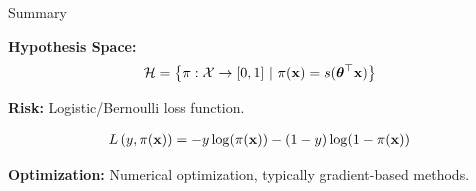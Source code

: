 \documentclass[11pt,compress,t,notes=noshow, xcolor=table]{beamer}
\begin{document}




 





\begin{frame}{Summary}

\textbf{Hypothesis Space:} 
\begin{eqnarray*}
  \mathcal{H} = \left\{\pi: \mathcal{X} \to [0,1] ~|~\pi(\mathbf{x}) = s(\bm{\theta}^\top \mathbf{x}) \right\}
\end{eqnarray*}

\lz

\textbf{Risk:} Logistic/Bernoulli loss function.

\begin{eqnarray*}
  L\left(y, \pi(\mathbf{x})\right) = -y\log(\pi(\mathbf{x}))-(1-y)\log(1-\pi(\mathbf{x}))
\end{eqnarray*}

\lz


\textbf{Optimization:} Numerical optimization, typically gradient-based methods.




\end{frame}

\endlecture
\end{document}
